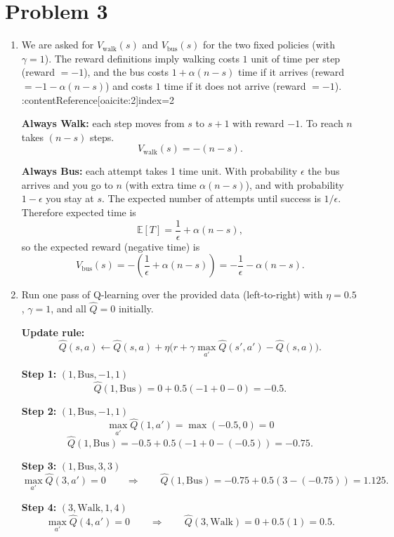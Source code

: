 \documentclass{article}
\begin{document}
\section*{Problem 3}
\begin{enumerate}[label=(\alph*)]

\item %
We are asked for $V_{\text{walk}}(s)$ and $V_{\text{bus}}(s)$ for the two fixed policies (with $\gamma=1$). 
The reward definitions imply walking costs $1$ unit of time per step (reward $=-1$), and the bus costs
$1+\alpha(n-s)$ time if it arrives (reward $=-1-\alpha(n-s)$) and costs $1$ time if it does not arrive (reward $=-1$). :contentReference[oaicite:2]{index=2}

\medskip
\noindent \textbf{Always Walk:} each step moves from $s$ to $s+1$ with reward $-1$. To reach $n$ takes $(n-s)$ steps.
\[
V_{\text{walk}}(s)=-(n-s).
\]

\medskip
\noindent \textbf{Always Bus:} each attempt takes 1 time unit. With probability $\epsilon$ the bus arrives and you go to $n$
(with extra time $\alpha(n-s)$), and with probability $1-\epsilon$ you stay at $s$.
The expected number of attempts until success is $1/\epsilon$. Therefore expected time is
\[
\mathbb{E}[T] = \frac{1}{\epsilon} + \alpha(n-s),
\]
so the expected reward (negative time) is
\[
V_{\text{bus}}(s)= -\left(\frac{1}{\epsilon}+\alpha(n-s)\right)= -\frac{1}{\epsilon}-\alpha(n-s).
\]

\item %
Run one pass of Q-learning over the provided data (left-to-right) with $\eta=0.5$, $\gamma=1$, and all $\hat Q=0$ initially.

\medskip
\noindent \textbf{Update rule:}
\[
\hat Q(s,a)\leftarrow \hat Q(s,a)+\eta\Big(r+\gamma\max_{a'}\hat Q(s',a')-\hat Q(s,a)\Big).
\]

\medskip
\noindent \textbf{Step 1: } $(1,\text{Bus},-1,1)$
\[
\hat Q(1,\text{Bus}) = 0 + 0.5(-1+0-0) = -0.5.
\]

\medskip
\noindent \textbf{Step 2: } $(1,\text{Bus},-1,1)$
\[
\max_{a'}\hat Q(1,a')=\max(-0.5,0)=0
\]
\[
\hat Q(1,\text{Bus}) = -0.5 + 0.5(-1+0-(-0.5)) = -0.75.
\]

\medskip
\noindent \textbf{Step 3: } $(1,\text{Bus},3,3)$
\[
\max_{a'}\hat Q(3,a')=0
\qquad\Rightarrow\qquad
\hat Q(1,\text{Bus}) = -0.75 + 0.5(3-(-0.75)) = 1.125.
\]

\medskip
\noindent \textbf{Step 4: } $(3,\text{Walk},1,4)$
\[
\max_{a'}\hat Q(4,a')=0
\qquad\Rightarrow\qquad
\hat Q(3,\text{Walk}) = 0 + 0.5(1)=0.5.
\]


\end{enumerate}
\end{document}
